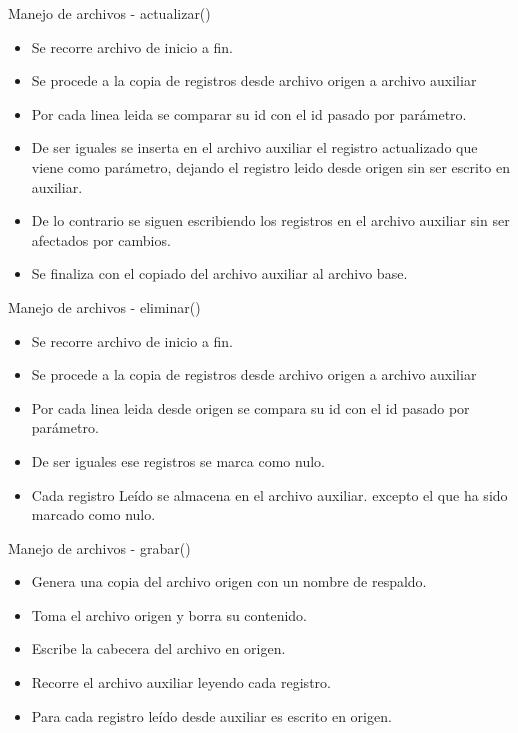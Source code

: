 \begin{frame}{Manejo de archivos - actualizar()}
\begin{itemize}
\item Se recorre archivo de inicio a fin.
\item Se procede a la copia de registros desde archivo origen a archivo auxiliar
 \item Por cada linea leida se comparar su id  con el id pasado por par\'ametro.
 \item De ser iguales se inserta en el archivo auxiliar el registro actualizado que viene como par\'ametro, dejando el registro leido desde origen sin ser escrito en auxiliar.
 \item De lo contrario se siguen escribiendo los registros en el archivo auxiliar sin ser afectados por cambios.
\item Se finaliza con el copiado del archivo auxiliar al archivo base.
\end{itemize}
\end{frame}

\begin{frame}{Manejo de archivos - eliminar()}
\begin{itemize}
\item Se recorre archivo de inicio a fin.
\item Se procede a la copia de registros desde archivo origen a archivo auxiliar
\item Por cada linea leida desde origen se compara su id  con el id pasado por par\'ametro.
\item De ser iguales ese registros se marca como nulo.
\item Cada registro Le\'ido se almacena en el archivo auxiliar. excepto el que ha sido marcado como nulo.
\end{itemize}
\end{frame}

\begin{frame}{Manejo de archivos - grabar()}
\begin{itemize}
\item Genera una copia del archivo origen con un nombre de respaldo.
\item Toma el archivo origen y borra su contenido.
\item Escribe la cabecera del archivo en origen.
\item Recorre el archivo auxiliar leyendo cada registro.
\item Para cada registro le\'ido desde auxiliar es escrito en origen.
	\end{itemize}
\end{frame}
